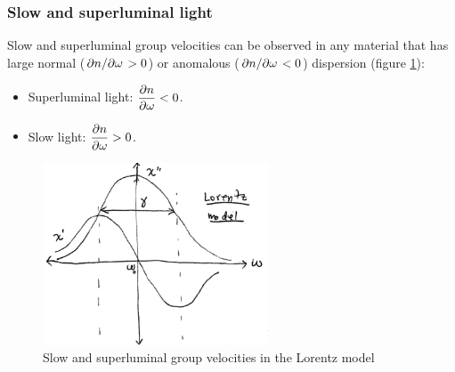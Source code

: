 \subsubsection*{Slow and superluminal light}
Slow and superluminal group velocities can be observed in any material that has large normal ($\pdv*{n}{\omega} > 0$) or anomalous ($\pdv*{n}{\omega} < 0$) dispersion (figure \ref{fig:lorentz-group-vel}):
\begin{itemize}
	\item Superluminal light: $\displaystyle \pdv{n}{\omega} < 0$.
	\item Slow light: $\displaystyle \pdv{n}{\omega} > 0$.
\end{itemize}
\begin{figure}[H]
	\centering
	\includegraphics[width=0.6\textwidth]{./images/2-lorentz-group-vel}
	\caption{Slow and superluminal group velocities in the Lorentz model}
	\label{fig:lorentz-group-vel}
\end{figure}
